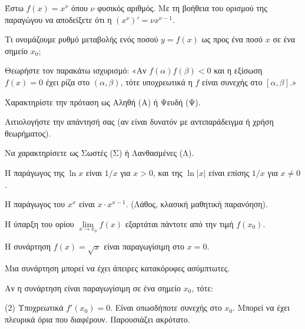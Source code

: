 \documentclass[11pt,a4paper]{article}
\newcommand{\kerkissans}[1]{{\fontfamily{maksf}\selectfont \textbf{#1}}}
\renewcommand{\textdexiakeraia}{}
\newcommand\themanum{A}
\newcounter{thema}[section]
\renewcommand{\thethema}{\arabic{thema}}
\newcommand{\Thema}{\refstepcounter{thema}{\textbf{\textcolor{black}{\faPenSquare\ \  \large \kerkissans{\textbf{\thethemaο\hspace{2mm}Διαγώνισμα - Θέμα \themanum}}}}}\hspace{0mm}}{}
\newenvironment{thema}[1]
{\begin{tcolorbox}[title=\Thema\kerkissans{\textbf{\large{  #1}}},breakable,
enhanced standard,titlerule=0pt,toprule=0pt, rightrule=0pt, bottomrule=0pt,
colback=white,left=0mm,top=1mm,bottom=0mm,
boxrule=0pt,
colframe=white,leftrule=0mm,sharp corners,coltitle=black]
\renewcommand{\themanum}{#1}}
{\end{tcolorbox}}
\begin{document}
\begin{thema}{A}
\begin{erwthma}
    \item Έστω $f(x) = x^\nu$ όπου $\nu$ φυσικός αριθμός. Με τη βοήθεια του ορισμού της παραγώγου να αποδείξετε ότι η $(x^\nu)' = \nu x^{\nu - 1}$.
    \item Τι ονομάζουμε ρυθμό μεταβολής ενός ποσού $y=f(x)$ ως προς ένα ποσό $x$ σε ένα σημείο $x_0$;
    \item Θεωρήστε τον παρακάτω ισχυρισμό:
    «Αν $f(\alpha)f(\beta)<0$ και η εξίσωση $f(x)=0$ έχει ρίζα στο $(\alpha, \beta)$, τότε υποχρεωτικά η $f$ είναι συνεχής στο $[\alpha, \beta]$.»
    \begin{alist}
    \item Χαρακτηρίστε την πρόταση ως Αληθή (Α) ή Ψευδή (Ψ).
    \item Αιτιολογήστε την απάντησή σας (αν είναι δυνατόν με αντιπαράδειγμα ή χρήση θεωρήματος).
    \end{alist}
    \item Να χαρακτηρίσετε ως Σωστές (Σ) ή Λανθασμένες (Λ).
    \begin{alist}
        \item Η παράγωγος της $\ln x$ είναι $1/x$ για $x>0$, και της $\ln |x|$ είναι επίσης $1/x$ για $x \ne 0$.
        \item Η παράγωγος του $x^x$ είναι $x \cdot x^{x-1}$. (Λάθος, κλασική μαθητική παρανόηση).
        \item Η ύπαρξη του ορίου $\lim\limits_{x\to x_0} f(x)$ εξαρτάται πάντοτε από την τιμή $f(x_0)$.
        \item Η συνάρτηση $f(x) = \sqrt{x}$ είναι παραγωγίσιμη στο $x=0$.
        \item Μια συνάρτηση μπορεί να έχει άπειρες κατακόρυφες ασύμπτωτες.
    \end{alist}
    \item Αν η συνάρτηση είναι παραγωγίσιμη σε ένα σημείο $x_0$, τότε:
    \begin{tasks}[label=\let\textdexiakeraia\relax\alph*.](2)
        \task Υποχρεωτικά $f'(x_0) = 0$.
        \task Είναι οπωσδήποτε συνεχής στο $x_0$.
        \task Μπορεί να έχει πλευρικά όρια που διαφέρουν.
        \task Παρουσιάζει ακρότατο.
    \end{tasks}
\end{erwthma}
\end{thema}
\vspace{1cm}
\end{document}

